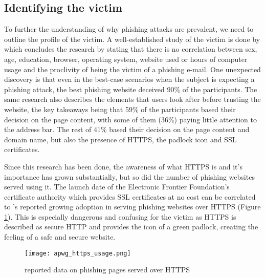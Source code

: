 \subsection{Identifying the victim}
To further the understanding of why phishing attacks are prevalent, we need to
outline the profile of the victim. A well-established study of the victim is
done by \cite{WHY_PHISHING_WORKS} which concludes the research by stating that
there is no correlation between sex, age, education, browser, operating system,
website used or hours of computer usage and the proclivity of being the victim
of a phishing e-mail. One unexpected discovery is that even in the best-case
scenarios when the subject is expecting a phishing attack, the best phishing
website deceived 90\% of the participants. The same research also describes the
elements that users look after before trusting the website, the key takeaways
being that 59\% of the participants based their decision on the page content,
with some of them (36\%) paying little attention to the address bar. The rest of
41\% based their decision on the page content and domain name, but also the
presence of HTTPS, the padlock icon and SSL certificates.

Since this research has been done, the awareness of what HTTPS is and it's
importance has grown substantially, but so did the number of phishing websites
served using it. The launch date of the Electronic Frontier Foundation's
\citep{EFF_LETS_ENCRYPT} certificate authority which provides SSL certificates
at no cost can be correlated to \cite{APWG_Q42019}'s reported growing adoption
in serving phishing websites over HTTPS (Figure \ref{fig:HTTPS_USAGE}). This is
especially dangerous and confusing for the victim as HTTPS is described as
secure HTTP and provides the icon of a green padlock, creating the feeling of a
safe and secure website.

\begin{figure}[t]
	\centering
	\texttt{[image: apwg\_https\_usage.png]}
	\caption{
		\cite{APWG_Q42019} reported data on phishing pages served over HTTPS}
	\label{fig:HTTPS_USAGE}
\end{figure}

